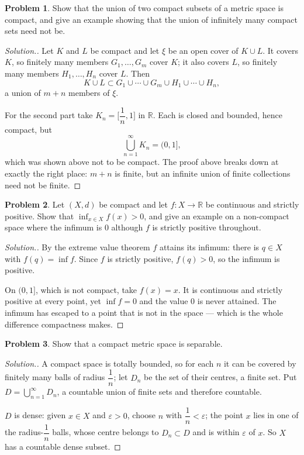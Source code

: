 \documentclass[11pt,a4paper]{article}
\theoremstyle{definition}
\newtheorem{problemx}{Problem}[section]
\newenvironment{problem}{\begin{problemx}}{\end{problemx}}
\newenvironment{solution}
  {\renewcommand{\qedsymbol}{}\begin{proof}[\textit{Solution}.]}
  {\end{proof}}
\begin{document}
\begin{problem}
Show that the union of two compact subsets of a metric space is compact, and
give an example showing that the union of infinitely many compact sets need not
be.
\end{problem}
\begin{solution}
Let $K$ and $L$ be compact and let $\xi$ be an open cover of $K\cup L$. It
covers $K$, so finitely many members $G_1,\dots,G_m$ cover $K$; it also covers
$L$, so finitely many members $H_1,\dots,H_n$ cover $L$. Then
$$K\cup L \subset G_1\cup\cdots\cup G_m\cup H_1\cup\cdots\cup H_n ,$$
a union of $m+n$ members of $\xi$.

For the second part take $K_n=\Big[\dfrac1n,1\Big]$ in $\mathbb{R}$. Each is
closed and bounded, hence compact, but
$$\bigcup_{n=1}^{\infty}K_n = (0,1] ,$$
which was shown above not to be compact. The proof above breaks down at exactly
the right place: $m+n$ is finite, but an infinite union of finite collections
need not be finite.
\end{solution}

\begin{problem}
Let $(X,d)$ be compact and let $f:X\rightarrow\mathbb{R}$ be continuous and
strictly positive. Show that $\displaystyle{\inf_{x\in X}f(x)>0}$, and give an
example on a non-compact space where the infimum is $0$ although $f$ is strictly
positive throughout.
\end{problem}
\begin{solution}
By the extreme value theorem $f$ attains its infimum: there is $q\in X$ with
$f(q)=\inf f$. Since $f$ is strictly positive, $f(q)>0$, so the infimum is
positive.

On $(0,1]$, which is not compact, take $f(x)=x$. It is continuous and strictly
positive at every point, yet $\inf f = 0$ and the value $0$ is never attained.
The infimum has escaped to a point that is not in the space --- which is the
whole difference compactness makes.
\end{solution}

\begin{problem}
Show that a compact metric space is separable.
\end{problem}
\begin{solution}
A compact space is totally bounded, so for each $n$ it can be covered by
finitely many balls of radius $\dfrac1n$; let $D_n$ be the set of their centres,
a finite set. Put $D=\bigcup_{n=1}^{\infty}D_n$, a countable union of finite
sets and therefore countable.

$D$ is dense: given $x\in X$ and $\varepsilon>0$, choose $n$ with
$\dfrac1n<\varepsilon$; the point $x$ lies in one of the radius-$\dfrac1n$ balls,
whose centre belongs to $D_n\subset D$ and is within $\varepsilon$ of $x$. So
$X$ has a countable dense subset.
\end{solution}
\end{document}
